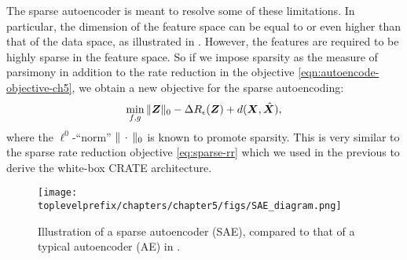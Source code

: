 \documentclass[../../book-main.tex]{subfiles}
\begin{document}
The sparse autoencoder is meant to resolve some of these limitations. In
particular, the dimension of the feature space can be equal to or
even higher than that of the data space, as illustrated in 
. However, the features are required to be highly
sparse in the feature space. So if we impose sparsity as the measure
of parsimony in addition to the rate reduction in the objective
\eqref{eqn:autoencode-objective-ch5}, we obtain a new objective for
the sparse autoencoding:
\begin{equation}
  \min_{f, g}
  \|\bm{Z}\|_0 - \Delta R_{\epsilon}(\bm{Z}) + d(\bm{X}, \hat {\bm{X}}),
  \label{eqn:autoencode-sparse}
\end{equation}
where the $\ell^0$-``norm'' $\|\,\cdot\,\|_0$ is known to promote sparsity.
This is very similar to the sparse rate reduction objective
\eqref{eq:sparse-rr} which we used in the previous  to derive the white-box CRATE architecture.

\begin{figure}
  \centering
  \texttt{[image: \\toplevelprefix/chapters/chapter5/figs/SAE\_diagram.png]}
  \caption{Illustration of a sparse autoencoder (SAE), compared to
  that of a typical autoencoder (AE) in . }
  \label{fig:SAE}
\end{figure}

\end{document}
